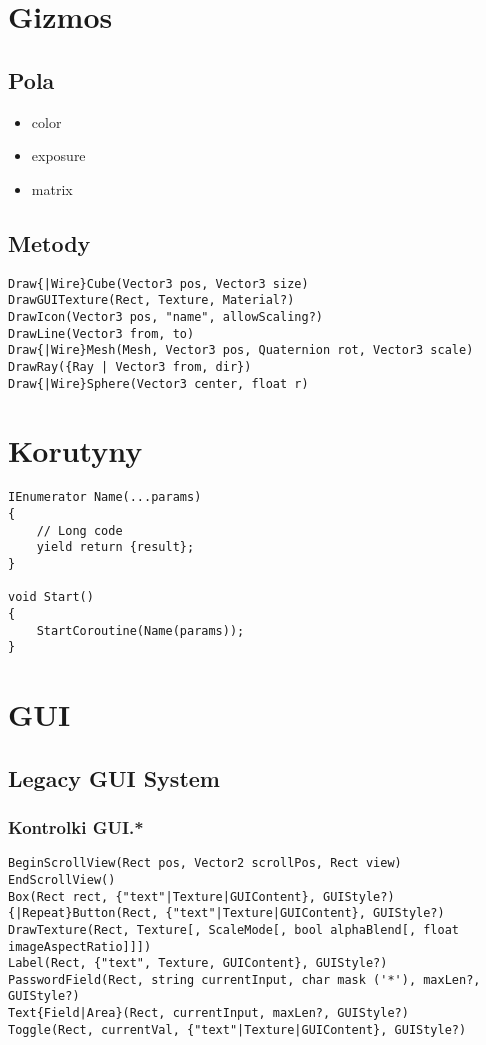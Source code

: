 \documentclass{article}
\begin{document}
\section{Gizmos}
\subsection{Pola}
\begin{itemize}
    \item color
    \item exposure
    \item matrix
\end{itemize}

\subsection{Metody}
\begin{lstlisting}
Draw{|Wire}Cube(Vector3 pos, Vector3 size)
DrawGUITexture(Rect, Texture, Material?)
DrawIcon(Vector3 pos, "name", allowScaling?)
DrawLine(Vector3 from, to)
Draw{|Wire}Mesh(Mesh, Vector3 pos, Quaternion rot, Vector3 scale)
DrawRay({Ray | Vector3 from, dir})
Draw{|Wire}Sphere(Vector3 center, float r)
\end{lstlisting}

\section{Korutyny}
\begin{lstlisting}
IEnumerator Name(...params)
{
    // Long code
    yield return {result};
}

void Start()
{
    StartCoroutine(Name(params));
}
\end{lstlisting}

\section{GUI}
\subsection{Legacy GUI System}
\subsubsection{Kontrolki GUI.*}
\begin{lstlisting}
BeginScrollView(Rect pos, Vector2 scrollPos, Rect view)
EndScrollView()
Box(Rect rect, {"text"|Texture|GUIContent}, GUIStyle?)
{|Repeat}Button(Rect, {"text"|Texture|GUIContent}, GUIStyle?)
DrawTexture(Rect, Texture[, ScaleMode[, bool alphaBlend[, float imageAspectRatio]]])
Label(Rect, {"text", Texture, GUIContent}, GUIStyle?)
PasswordField(Rect, string currentInput, char mask ('*'), maxLen?, GUIStyle?)
Text{Field|Area}(Rect, currentInput, maxLen?, GUIStyle?)
Toggle(Rect, currentVal, {"text"|Texture|GUIContent}, GUIStyle?)
\end{lstlisting}
\end{document}
